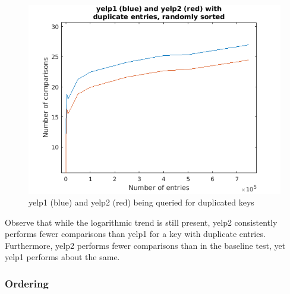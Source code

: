 \documentclass[australian,english]{article}
\begin{document}
\begin{figure}[H]
\includegraphics[scale=0.8]{figs/dups}

\caption{yelp1 (blue) and yelp2 (red) being queried for duplicated keys}
\end{figure}
Observe that while the logarithmic trend is still present, yelp2 consistently
performs fewer comparisons than yelp1 for a key with duplicate entries.
Furthermore, yelp2 performs fewer comparisons than in the baseline
test, yet yelp1 performs about the same.

\subsubsection*{Ordering}
\end{document}
